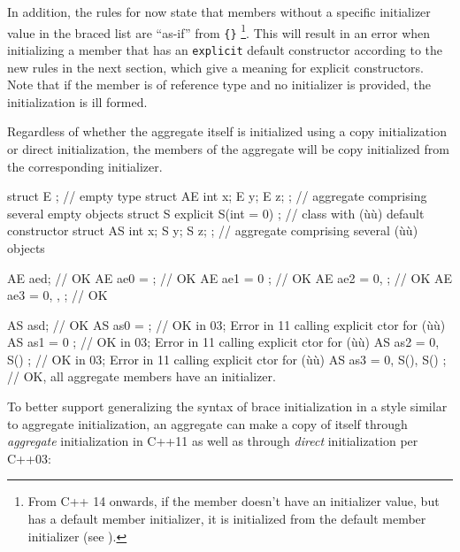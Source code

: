 \noindent In addition, the rules for  now state that
members without a specific initializer value in the braced list are
``as-if''  from \lstinline!{}!
{\cprotect\footnote{From C++ 14 onwards, if the member doesn't have an
initializer value, but has a default member initializer, it is
initialized from the default member initializer (see ).}}. This will result in an error when
initializing a member that has an \lstinline!explicit! default constructor
according to the new  rules in
the next section, which give a meaning for explicit constructors. Note
that if the member is of reference type and no initializer is provided,
the initialization is ill formed.

Regardless of whether the aggregate itself is initialized using a copy
initialization or direct initialization, the members of the aggregate
will be copy initialized from the corresponding initializer.

\begin{emcppslisting}[emcppsbatch=e4,emcppserrorlines={13,14,15}]
struct E { };                         // empty type
struct AE { int x; E y; E z; };       // aggregate comprising several empty objects
struct S { explicit S(int = 0) {} };  // class with (ù{}ù) default constructor
struct AS{ int x; S y; S z; };        // aggregate comprising several (ù{}ù) objects

AE aed;                    // OK
AE ae0 = {};               // OK
AE ae1 = { 0 };            // OK
AE ae2 = { 0, {} };        // OK
AE ae3 = { 0, {}, {} };    // OK

AS asd;                    // OK
AS as0 = {};               // OK in 03; Error in 11 calling explicit ctor for (ù{}ù)
AS as1 = { 0 };            // OK in 03; Error in 11 calling explicit ctor for (ù{}ù)
AS as2 = { 0, S() };       // OK in 03; Error in 11 calling explicit ctor for (ù{}ù)
AS as3 = { 0, S(), S() };  // OK, all aggregate members have an initializer.
\end{emcppslisting}
    

\noindent To better support generalizing the syntax of brace initialization in a
style similar to aggregate initialization, an aggregate can make a copy
of itself through \emph{aggregate} initialization in C++11 as well as
through \emph{direct} initialization per C++03:

